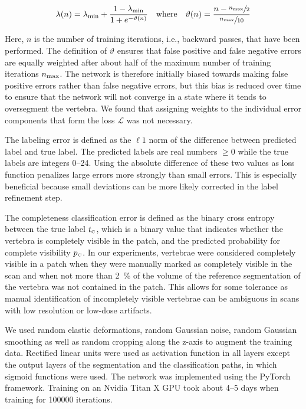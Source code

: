 \documentclass[authoryear,5p,final,times]{elsarticle}
\begin{document}
    \begin{equation*}
        \lambda(n) =
            \lambda_{\textnormal{min}} +
            \frac{
                1 - \lambda_{\textnormal{min}}
            }{
                1 + e^{-\vartheta(n)}
            }
            \quad
            \textnormal{where}
            \quad
            \vartheta(n) = \frac{
                n - \sfrac{n_{\textnormal{max}}}{2}
            }{
                \sfrac{n_{\textnormal{max}}}{10}
            }
    \end{equation*}

    \noindent
    Here, $n$ is the number of training iterations, i.e., backward passes, that have been performed. The definition of $\vartheta$ ensures that false positive and false negative errors are equally weighted after about half of the maximum number of training iterations $n_{\textnormal{max}}$. The network is therefore initially biased towards making false positive errors rather than false negative errors, but this bias is reduced over time to ensure that the network will not converge in a state where it tends to oversegment the vertebra. We found that assigning weights to the individual error components that form the loss $\mathcal{L}$ was not necessary.

    The labeling error is defined as the $\ell 1$ norm of the difference between predicted label and true label. The predicted labels are real numbers $\geq 0$ while the true labels are integers \numrange{0}{24}. Using the absolute difference of these two values as loss function penalizes large errors more strongly than small errors. This is especially beneficial because small deviations can be more likely corrected in the label refinement step.

    The completeness classification error is defined as the binary cross entropy between the true label $t_\textnormal{\tiny C}$, which is a binary value that indicates whether the vertebra is completely visible in the patch, and the predicted probability for complete visibility $p_\textnormal{\tiny C}$. In our experiments, vertebrae were considered completely visible in a patch when they were manually marked as completely visible in the scan and when not more than \SI{2}{\percent} of the volume of the reference segmentation of the vertebra was not contained in the patch. This allows for some tolerance as manual identification of incompletely visible vertebrae can be ambiguous in scans with low resolution or low-dose artifacts.

    We used random elastic deformations, random Gaussian noise, random Gaussian smoothing as well as random cropping along the z-axis to augment the training data. Rectified linear units were used as activation function in all layers except the output layers of the segmentation and the classification paths, in which sigmoid functions were used. The network was implemented using the PyTorch framework. Training on an Nvidia Titan X GPU took about 4--5 days when training for \num{100000} iterations.
\end{document}
